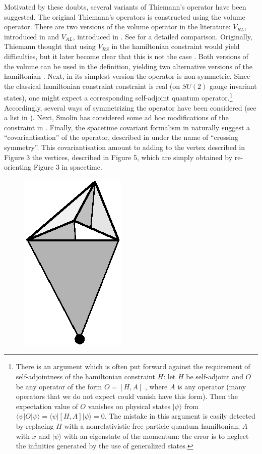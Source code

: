 \documentclass[12pt]{article}
\begin{document}
\begin{description}
Motivated by these doubts, several variants of Thiemann's 
operator have been suggested.  The original Thiemann's operators 
is constructed using the volume operator.  There are two versions 
of the volume operator in the literature: $V_{RL}$, introduced in 
\cite{RovelliSmolin95} and $V_{AL}$, introduced in 
\cite{AshtekarLewandowski,AshtekarLewandowski2,%
AshtekarLewandowski3}.  See 
\cite{Lewandowski97} for a detailed comparison.  Originally, 
Thiemann thought that using $V_{RS}$ in the hamiltonian 
constraint would yield difficulties, but it later become clear 
that this is not the case \cite{LewandowskiMarolf}.  Both 
versions of the volume can be used in the definition, yielding 
two alternative versions of the hamiltonian 
\cite{LewandowskiMarolf}.  Next, in its simplest version the 
operator is non-symmetric.  Since the classical hamiltonian 
constraint constraint is real (on $SU(2)$ gauge invariant 
states), one might expect a corresponding self-adjoint quantum 
operator.\footnote{There is an argument which is often put 
forward against the requirement of self-adjointness of the 
hamiltonian constraint $H$: let $H$ be self-adjoint and $O$ be 
any operator of the form $O=[H,A]$ , where $A$ is any operator 
(many operators that we do not expect could vanish have this 
form).  Then the expectation value of $O$ vanishes on physical 
states $|\psi\rangle$ from 
$\langle\psi|O|\psi\rangle=\langle\psi|[H,A]|\psi\rangle=0$.  The 
mistake in this argument is easily detected by replacing $H$ with 
a nonrelativistic free particle quantum hamiltonian, $A$ with $x$ 
and $|\psi\rangle$ with an eigenstate of the momentum: the error 
is to neglect the infinities generated by the use of generalized 
states.} Accordingly, several ways of symmetrizing the operator 
have been considered (see a list in \cite{LewandowskiMarolf}).  
Next, Smolin has considered some ad hoc modifications of the 
constraint in \cite{Smolin96}.  Finally, the spacetime covariant 
formalism in \cite{ReisenbergerRovelli} naturally suggest a 
``covariantisation'' of the operator, described in 
\cite{ReisenbergerRovelli} under the name of ``crossing 
symmetry''.  This covariantisation amount to adding to the vertex 
described in Figure 3 the vertices, described in Figure 5, which 
are simply obtained by re-orienting Figure 3 in spacetime.
 \begin{figure}
 \centerline{\mbox{\includegraphics{RovelliFig4.eps}} \hskip1cm 
}
\end{figure}
\end{description}
\end{document}
